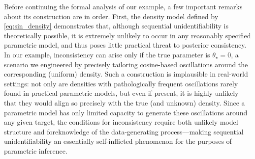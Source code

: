 \documentclass[11pt,twoside]{article}
\begin{document}
Before continuing the formal analysis of our example, a few important remarks about its construction are in order. First, the density model defined by \eqref{eq:sin_density} demonstrates that, although sequential unidentifiability is theoretically possible, it is extremely unlikely to occur in any reasonably specified parametric model, and thus poses little practical threat to posterior consistency. In our example, inconsistency can arise only if the true parameter is $\theta_\star = 0$, a scenario we engineered by precisely tailoring cosine-based oscillations around the corresponding (uniform) density. Such a construction is implausible in real-world settings: not only are densities with pathologically frequent oscillations rarely found in practical parametric models, but even if present, it is highly unlikely that they would align so precisely with the true (and unknown) density. Since a parametric model has only limited capacity to generate these oscillations around any given target, the conditions for inconsistency require both unlikely model structure and foreknowledge of the data-generating process---making sequential unidentifiability an essentially self-inflicted phenomenon for the purposes of parametric inference.
\end{document}

